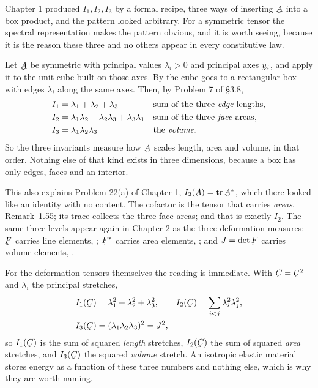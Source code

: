 \begin{remark}\label{rem:invgeom}
Chapter 1 produced $I_{1},I_{2},I_{3}$ by a formal recipe, three ways of
inserting $\bA$ into a box product, and the pattern looked arbitrary. For a
symmetric tensor the spectral representation makes the pattern obvious, and
it is worth seeing, because it is the reason these three and no others
appear in every constitutive law.

Let $\bA$ be symmetric with principal values $\lambda_{i}>0$ and principal
axes $\bu_{i}$, and apply it to the unit cube built on those axes. By
 the cube goes to a rectangular box with edges $\lambda_{i}$ along
the same axes. Then, by Problem 7 of \S3.8,
\[
\begin{aligned}
   I_{1}&=\lambda_{1}+\lambda_{2}+\lambda_{3}
     &&\text{sum of the three \emph{edge} lengths,}\\
   I_{2}&=\lambda_{1}\lambda_{2}+\lambda_{2}\lambda_{3}
          +\lambda_{3}\lambda_{1}
     &&\text{sum of the three \emph{face} areas,}\\
   I_{3}&=\lambda_{1}\lambda_{2}\lambda_{3}
     &&\text{the \emph{volume}.}
\end{aligned}
\]
So the three invariants measure how $\bA$ scales length, area and volume,
in that order. Nothing else of that kind exists in three dimensions,
because a box has only edges, faces and an interior.

This also explains Problem 22(a) of Chapter 1, $I_{2}(\bA)=\tr\bA^{*}$,
which there looked like an identity with no content. The cofactor is the
tensor that carries \emph{areas}, Remark~1.55; its trace collects the three
face areas; and that is exactly $I_{2}$. The same three levels appear again
in Chapter 2 as the three deformation measures: $\bF$ carries line
elements, ; $\bF^{*}$ carries area elements, ; and
$J=\det\bF$ carries volume elements, .

For the deformation tensors themselves the reading is immediate. With
$\bC=\bU^{2}$ and $\lambda_{i}$ the principal stretches,
\[
\begin{aligned}
   I_{1}(\bC)&=\lambda_{1}^{2}+\lambda_{2}^{2}+\lambda_{3}^{2},\qquad
   I_{2}(\bC)=\sum_{i<j}\lambda_{i}^{2}\lambda_{j}^{2},\\
   I_{3}(\bC)&=(\lambda_{1}\lambda_{2}\lambda_{3})^{2}=J^{2},
\end{aligned}
\]
so $I_{1}(\bC)$ is the sum of squared \emph{length} stretches,
$I_{2}(\bC)$ the sum of squared \emph{area} stretches, and $I_{3}(\bC)$ the
squared \emph{volume} stretch. An isotropic elastic material stores energy
as a function of these three numbers and nothing else, which is why they
are worth naming.
\end{remark}

